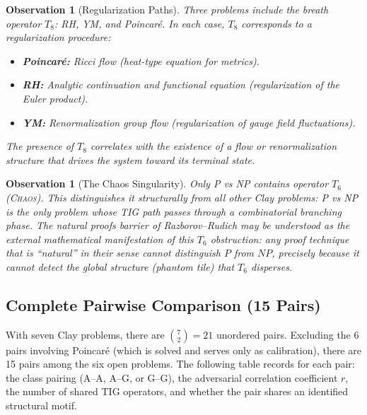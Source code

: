 \documentclass[11pt]{article}
\newtheorem{observation}[theorem]{Observation}
\begin{document}
\begin{observation}[Regularization Paths]
Three problems include the breath operator $T_8$: RH, YM, and
Poincar\'e.  In each case, $T_8$ corresponds to a regularization
procedure:
\begin{itemize}
\item \textbf{Poincar\'e:} Ricci flow (heat-type equation for metrics).
\item \textbf{RH:} Analytic continuation and functional equation
(regularization of the Euler product).
\item \textbf{YM:} Renormalization group flow (regularization of
gauge field fluctuations).
\end{itemize}
The presence of $T_8$ correlates with the existence of a flow or
renormalization structure that drives the system toward its terminal
state.
\end{observation}

\begin{observation}[The Chaos Singularity]
Only P vs NP contains operator $T_6$ (\textsc{Chaos}).  This
distinguishes it structurally from all other Clay problems: P vs NP
is the only problem whose TIG path passes through a combinatorial
branching phase.  The natural proofs barrier of Razborov--Rudich
\cite{RR} may be understood as the external mathematical manifestation
of this $T_6$ obstruction: any proof technique that is ``natural'' in
their sense cannot distinguish $P$ from $NP$, precisely because it
cannot detect the global structure (phantom tile) that $T_6$
disperses.
\end{observation}

\subsection{Complete Pairwise Comparison (15 Pairs)}
\label{subsec:pairwise}

With seven Clay problems, there are $\binom{7}{2} = 21$ unordered pairs.
Excluding the 6 pairs involving Poincar\'e (which is solved and serves only
as calibration), there are 15 pairs among the six open problems.  The
following table records for each pair: the class pairing (A--A, A--G, or
G--G), the adversarial correlation coefficient $r$, the number of shared
TIG operators, and whether the pair shares an identified structural motif.
\end{document}
